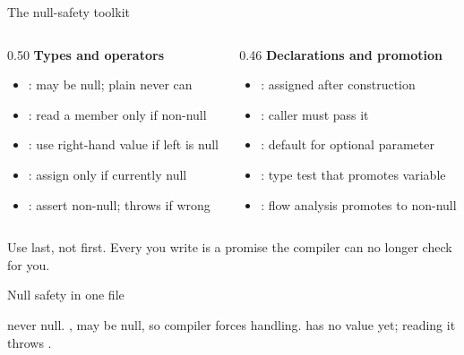 \documentclass[10pt,aspectratio=169,t]{beamer}
\begin{document}
\begin{frame}[eyebrow=Reference]{The null-safety toolkit}
  {\small
  \begin{columns}[T]
    \begin{column}{0.50\textwidth}
      \textbf{Types and operators}
      \begin{itemize}
        \item {}: may be null; plain  never can
        \item {}: read a member only if non-null
        \item {}: use right-hand value if left is null
        \item {}: assign only if currently null
        \item \code{!}: assert non-null; throws if wrong
      \end{itemize}
    \end{column}
    \begin{column}{0.46\textwidth}
      \textbf{Declarations and promotion}
      \begin{itemize}
        \item {}: assigned after construction
        \item {}: caller must pass it
        \item {}: default for optional parameter
        \item {}: type test that promotes variable
        \item {}: flow analysis promotes to non-null
      \end{itemize}
    \end{column}
  \end{columns}
  }
  \vskip 2mm
  \begin{takeaway}{Use \code{!} last, not first.}
    Every \code{!} you write is a promise the compiler can no longer check for you.
  \end{takeaway}
\end{frame}

\begin{frame}[fragile,eyebrow=Reference]{Null safety in one file}
  {\small
   never null. ,  may be null, so compiler forces handling.  has no value yet; reading it throws .
  }
\end{frame}
\end{document}
